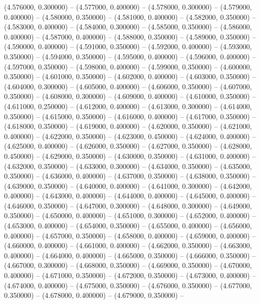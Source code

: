 (4.576000, 0.300000) -- 
(4.577000, 0.400000) -- 
(4.578000, 0.300000) -- 
(4.579000, 0.400000) -- 
(4.580000, 0.350000) -- 
(4.581000, 0.400000) -- 
(4.582000, 0.350000) -- 
(4.583000, 0.400000) -- 
(4.584000, 0.300000) -- 
(4.585000, 0.350000) -- 
(4.586000, 0.400000) -- 
(4.587000, 0.400000) -- 
(4.588000, 0.350000) -- 
(4.589000, 0.350000) -- 
(4.590000, 0.400000) -- 
(4.591000, 0.350000) -- 
(4.592000, 0.400000) -- 
(4.593000, 0.350000) -- 
(4.594000, 0.350000) -- 
(4.595000, 0.400000) -- 
(4.596000, 0.400000) -- 
(4.597000, 0.350000) -- 
(4.598000, 0.400000) -- 
(4.599000, 0.350000) -- 
(4.600000, 0.350000) -- 
(4.601000, 0.350000) -- 
(4.602000, 0.400000) -- 
(4.603000, 0.350000) -- 
(4.604000, 0.300000) -- 
(4.605000, 0.400000) -- 
(4.606000, 0.350000) -- 
(4.607000, 0.350000) -- 
(4.608000, 0.300000) -- 
(4.609000, 0.400000) -- 
(4.610000, 0.350000) -- 
(4.611000, 0.250000) -- 
(4.612000, 0.400000) -- 
(4.613000, 0.300000) -- 
(4.614000, 0.350000) -- 
(4.615000, 0.350000) -- 
(4.616000, 0.400000) -- 
(4.617000, 0.350000) -- 
(4.618000, 0.350000) -- 
(4.619000, 0.400000) -- 
(4.620000, 0.350000) -- 
(4.621000, 0.400000) -- 
(4.622000, 0.350000) -- 
(4.623000, 0.450000) -- 
(4.624000, 0.400000) -- 
(4.625000, 0.400000) -- 
(4.626000, 0.350000) -- 
(4.627000, 0.350000) -- 
(4.628000, 0.450000) -- 
(4.629000, 0.350000) -- 
(4.630000, 0.350000) -- 
(4.631000, 0.400000) -- 
(4.632000, 0.350000) -- 
(4.633000, 0.300000) -- 
(4.634000, 0.350000) -- 
(4.635000, 0.350000) -- 
(4.636000, 0.400000) -- 
(4.637000, 0.350000) -- 
(4.638000, 0.350000) -- 
(4.639000, 0.350000) -- 
(4.640000, 0.400000) -- 
(4.641000, 0.300000) -- 
(4.642000, 0.400000) -- 
(4.643000, 0.400000) -- 
(4.644000, 0.400000) -- 
(4.645000, 0.400000) -- 
(4.646000, 0.350000) -- 
(4.647000, 0.300000) -- 
(4.648000, 0.300000) -- 
(4.649000, 0.350000) -- 
(4.650000, 0.400000) -- 
(4.651000, 0.300000) -- 
(4.652000, 0.400000) -- 
(4.653000, 0.400000) -- 
(4.654000, 0.350000) -- 
(4.655000, 0.400000) -- 
(4.656000, 0.400000) -- 
(4.657000, 0.350000) -- 
(4.658000, 0.400000) -- 
(4.659000, 0.400000) -- 
(4.660000, 0.400000) -- 
(4.661000, 0.400000) -- 
(4.662000, 0.350000) -- 
(4.663000, 0.400000) -- 
(4.664000, 0.400000) -- 
(4.665000, 0.350000) -- 
(4.666000, 0.350000) -- 
(4.667000, 0.300000) -- 
(4.668000, 0.350000) -- 
(4.669000, 0.350000) -- 
(4.670000, 0.400000) -- 
(4.671000, 0.350000) -- 
(4.672000, 0.350000) -- 
(4.673000, 0.400000) -- 
(4.674000, 0.400000) -- 
(4.675000, 0.350000) -- 
(4.676000, 0.350000) -- 
(4.677000, 0.350000) -- 
(4.678000, 0.400000) -- 
(4.679000, 0.350000) -- 
